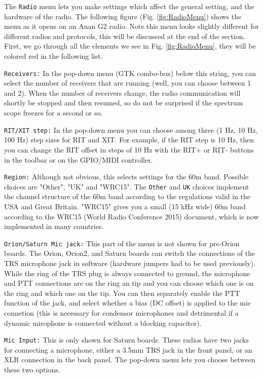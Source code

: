 \documentclass[12pt]{book}
\def\rett#1{\texttt{\color{red}#1}}
\def\bltt#1{\texttt{\color{blue}#1}}
\begin{document}
The \bltt{Radio} menu lets you make settings which affect the general setting, and the hardware of the radio.
The following figure (Fig. \ref{fig:RadioMenu}) shows the menu as it opens on an Anan G2 radio.
Note this menu looks slightly different for different radios and protocols, this will be discussed
at the end of the section. First, we go through all the elements we see in Fig. \ref{fig:RadioMenu},
they will be colored red in the following list.

\rett{Receivers:} In the pop-down menu (GTK combo-box) below this string, you can select the number
of receivers that are running (well, you can choose between 1 and 2). When the number of receivers change,
the radio communication will shortly be stopped and then resumed, so do not be surprised if the spectrum
scope freezes for a second or so.

\rett{RIT/XIT step:} In the pop-down menu you can choose among three (1 Hz, 10 Hz, 100 Hz) step sizes
for RIT and XIT. For example, if the RIT step is 10 Hz, then you can change the RIT offset in steps of
10 Hz with the RIT+ or RIT- buttons in the toolbar or on the GPIO/MIDI controller.

\rett{Region:} Although not obvious, this selects settings for the 60m band. Possible choices are "Other",
 "UK" and "WRC15". The \texttt{Other} and \texttt{UK} choices implement the channel structure of the 60m band according
to the regulations valid in the USA and Great Britain. "WRC15" gives you a small (15 kHz wide) 60m band according to the WRC15
(World Radio Conference 2015) document, which is now implemented in many countries. 

\rett{Orion/Saturn Mic jack:} This part of the menu is not shown for pre-Orion boards. 
The Orion, Orion2, and Saturn boards can switch the connections
 of the TRS microphone jack in software (hardware jumpers had to be used previously).
While the ring of the TRS plug is always connected to ground, the microphone and PTT connections are on the
ring an tip and you can choose which one is on the ring and which one on the tip. You can then separately
enable the PTT function of the jack, and select whether a bias (DC offset) is applied to the mic connetion
(this is necessary for condensor microphones and detrimental if a dynamic mirophone is connected without
a blocking capacitor).

\rett{Mic Input:} This is only shown for Saturn boards. These radios have two jacks for connecting a microphone,
either a 3.5mm TRS jack in the front panel, or an XLR connection in the back panel. The pop-down menu lets you
choose between these two options.
\end{document}
